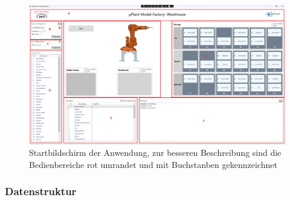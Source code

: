     \begin{figure}[ht]
        \label{fig:figure}
        \includegraphics[width = \textwidth ]{Bilder/LV_Startbildschirm}
        \caption[Ansicht des Startbildschirms]
        {\small Startbildschirm der Anwendung, zur besseren Beschreibung sind die Bedienbereiche rot umrandet und mit
        Buchstanben gekennzeichnet}
        \centering
    \end{figure}

    \subsubsection{Datenstruktur}

